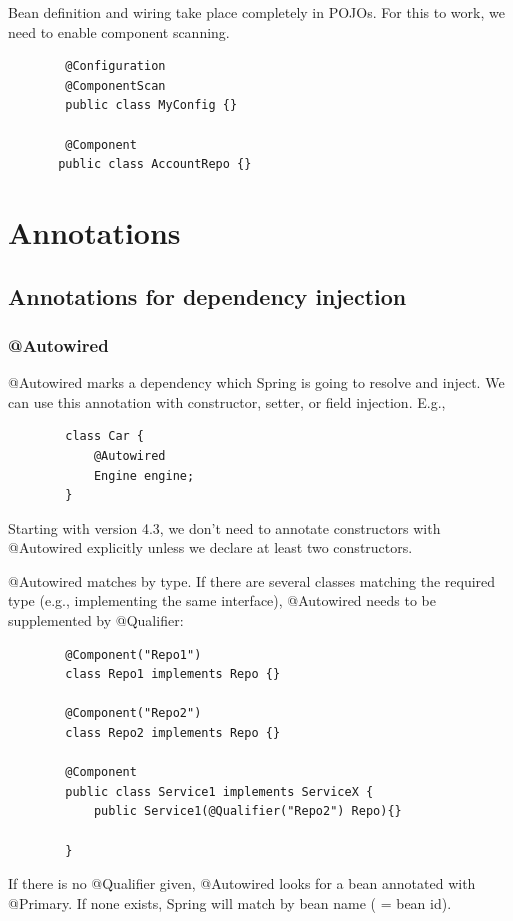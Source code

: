 \documentclass{scrartcl}
\begin{document}
    Bean definition and wiring take place completely in POJOs. For this to work, we need to enable component scanning.

    \begin{lstlisting}
        @Configuration
        @ComponentScan
        public class MyConfig {}

        @Component
       public class AccountRepo {}
    \end{lstlisting}


\section{Annotations}
\subsection{Annotations for dependency injection}
\subsubsection{@Autowired}
    @Autowired marks a dependency which Spring is going to resolve and inject. We can use this annotation with constructor, setter, or field injection. E.g.,

    \begin{lstlisting}
        class Car {
            @Autowired
            Engine engine;
        }
    \end{lstlisting}

    Starting with version 4.3, we don’t need to annotate constructors with @Autowired explicitly unless we declare at least two constructors.

    @Autowired matches by type. If there are several classes matching the required type (e.g., implementing the same interface), @Autowired needs to be supplemented by @Qualifier:

    \begin{lstlisting}
        @Component("Repo1")
        class Repo1 implements Repo {}

        @Component("Repo2")
        class Repo2 implements Repo {}

        @Component
        public class Service1 implements ServiceX {
            public Service1(@Qualifier("Repo2") Repo){}

        }

    \end{lstlisting}

    If there is no @Qualifier given, @Autowired looks for a bean annotated with @Primary. If none exists, Spring will match by bean name ( = bean id).
\end{document}

